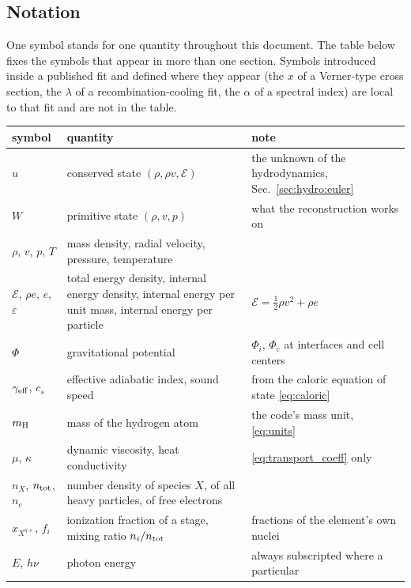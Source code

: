 \subsection{Notation}
\label{sec:intro:notation}

One symbol stands for one quantity throughout this document.  The table below
fixes the symbols that appear in more than one section.  Symbols introduced
inside a published fit and defined where they appear (the $x$ of a
Verner-type cross section, the $\lambda$ of a recombination-cooling fit, the
$\alpha$ of a spectral index) are local to that fit and are not in the table.

\begin{center}
\small
\begin{tabular}{@{}>{\raggedright\arraybackslash}p{}>{\raggedright\arraybackslash}p{}>{\raggedright\arraybackslash}p{}@{}}
\toprule
symbol & quantity & note \\
\midrule
$u$ & conserved state $(\rho,\rho v,\mathcal{E})$ &
  the unknown of the hydrodynamics, Sec.~\ref{sec:hydro:euler} \\
$W$ & primitive state $(\rho,v,p)$ & what the reconstruction works on \\
$\rho$, $v$, $p$, $T$ & mass density, radial velocity, pressure,
  temperature & \\
$\mathcal{E}$, $\rho e$, $e$, $\varepsilon$ & total energy density, internal
  energy density, internal energy per unit mass, internal energy per
  particle & $\mathcal{E} = \tfrac12\rho v^2+\rho e$ \\
$\Phi$ & gravitational potential & $\Phi_i$, $\Phi_c$ at interfaces and cell
  centers \\
$\gamma_{\rm eff}$, $c_s$ & effective adiabatic index, sound speed &
  from the caloric equation of state \eqref{eq:caloric} \\
$m_{\rm H}$ & mass of the hydrogen atom & the code's mass unit,
  \eqref{eq:units} \\
$\mu$, $\kappa$ & dynamic viscosity, heat conductivity &
  \eqref{eq:transport_coeff} only \\
$n_X$, $n_{\rm tot}$, $n_e$ & number density of species $X$, of all heavy
  particles, of free electrons & \\
$x_{X^{q+}}$, $f_i$ & ionization fraction of a stage, mixing ratio
  $n_i/n_{\rm tot}$ & fractions of the element's own nuclei \\
$E$, $h\nu$ & photon energy & always subscripted where a particular

\end{tabular}
\end{center}
